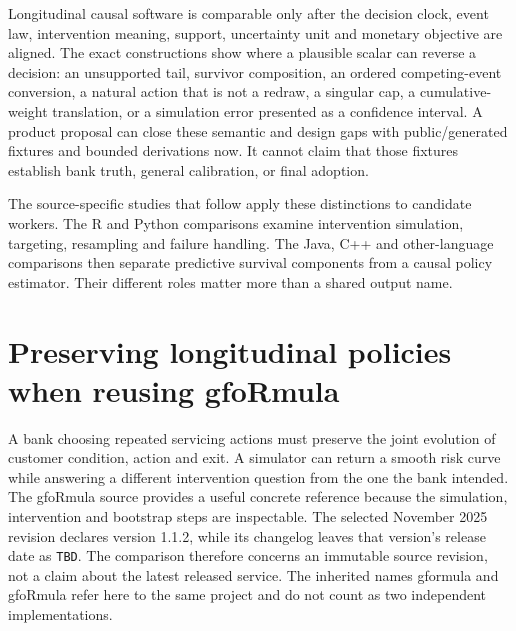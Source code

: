 Longitudinal causal software is comparable only after the decision clock,
event law, intervention meaning, support, uncertainty unit and monetary
objective are aligned. The exact constructions show where a plausible scalar
can reverse a decision: an unsupported tail, survivor composition, an ordered
competing-event conversion, a natural action that is not a redraw, a singular
cap, a cumulative-weight translation, or a simulation error presented as a
confidence interval. A product proposal can close these semantic and design
gaps with public/generated fixtures and bounded derivations now. It cannot
claim that those fixtures establish bank truth, general calibration, or final
adoption.

The source-specific studies that follow apply these distinctions to candidate
workers. The R and Python comparisons examine intervention simulation,
targeting, resampling and failure handling. The Java, C++ and other-language
comparisons then separate predictive survival components from a causal policy
estimator. Their different roles matter more than a shared output name.


\section{Preserving longitudinal policies when reusing gfoRmula}
\label{exec20:gformula-scope}
A bank choosing repeated servicing actions must preserve the joint evolution of customer condition, action and exit. A simulator can return a smooth risk curve while answering a different intervention question from the one the bank intended. The gfoRmula source provides a useful concrete reference because the simulation, intervention and bootstrap steps are inspectable. The selected November 2025 revision declares version 1.1.2, while its changelog leaves that version's release date as \texttt{TBD}. The comparison therefore concerns an immutable source revision, not a claim about the latest released service. The inherited names gformula and gfoRmula refer here to the same project and do not count as two independent implementations.~\citep{exec20_gformula_reuse}

